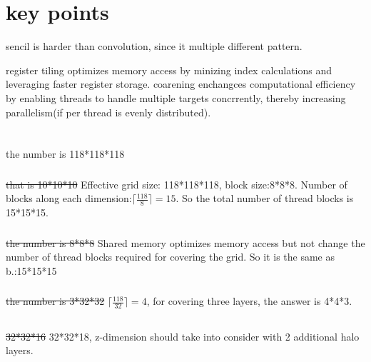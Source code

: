 \documentclass{article}
\begin{document}
\section*{key points}
sencil is harder than convolution, since it multiple different pattern.

register tiling optimizes memory access by minizing index calculations and leveraging faster register storage.
coarening enchangces computational efficiency by enabling threads to handle multiple targets concrrently, thereby increasing parallelism(if per thread is evenly distributed).

\section{}
\subsection{}
\subsubsection{}
the number is 118*118*118

\subsubsection{}
\sout{that is 10*10*10}
Effective grid size: 118*118*118, block size:8*8*8. Number of blocks along each dimension:\(\lceil \frac{118}{8}\rceil = 15\). So the total number of thread blocks is 15*15*15.

\subsubsection{}
\sout{the number is 8*8*8}
Shared memory optimizes memory access but not change the number of thread blocks required for covering the grid.
So it is the same as b.:15*15*15

\subsubsection{}
\sout{the number is 3*32*32}
\(\lceil \frac{118}{32}\rceil = 4\), for covering three layers, the answer is 4*4*3.

\subsection{}
\subsubsection{}
\sout{32*32*16} 32*32*18, z-dimension should take into consider with 2 additional halo layers.
\end{document}
